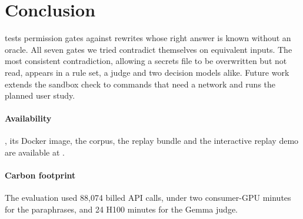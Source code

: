 
\section{Conclusion}\label{sec:conclusion}

\tool{} tests permission gates against rewrites whose right answer is known
without an oracle. All
seven gates we tried contradict themselves on equivalent inputs. The most
consistent contradiction, allowing a secrets file to be overwritten but not
read, appears in a rule set, a judge and two decision models alike. Future
work extends the sandbox check to commands that need a network and runs the
planned user study.

\paragraph{Availability}
\tool{}, its Docker image, the corpus, the replay bundle and the interactive
replay demo are available at \toolurl{} .

\paragraph{Carbon footprint}
The evaluation used 88,074 billed API calls, under two consumer-GPU minutes
for the paraphrases, and 24 H100 minutes for the Gemma judge.
